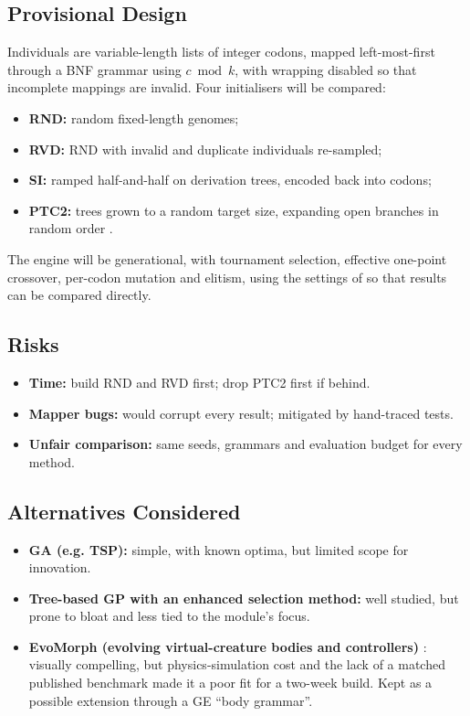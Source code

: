 \documentclass[11pt,a4paper]{article}
\begin{document}
    \subsection{Provisional Design}\label{subsec:provisional-design}
    Individuals are variable-length lists of integer codons, mapped left-most-first through a BNF grammar using $c \bmod k$, with wrapping disabled so that incomplete mappings are invalid.
    Four initialisers will be compared:
    \begin{itemize}[leftmargin=*,itemsep=0pt]
        \item \textbf{RND:} random fixed-length genomes;
        \item \textbf{RVD:} RND with invalid and duplicate individuals re-sampled;
        \item \textbf{SI:} ramped half-and-half on derivation trees, encoded back into codons;
        \item \textbf{PTC2:} trees grown to a random target size, expanding open branches in random order \citep{luke2000,harper2010}.
    \end{itemize}
    The engine will be generational, with tournament selection, effective one-point crossover, per-codon mutation and elitism, using the settings of \citet[Table 2]{nicolau2017} so that results can be compared directly.

    \subsection{Risks}\label{subsec:risks}
    \begin{itemize}[leftmargin=*,itemsep=0pt]
        \item \textbf{Time:} build RND and RVD first; drop PTC2 first if behind.
        \item \textbf{Mapper bugs:} would corrupt every result; mitigated by hand-traced tests.
        \item \textbf{Unfair comparison:} same seeds, grammars and evaluation budget for every method.
    \end{itemize}

    \subsection{Alternatives Considered}\label{subsec:alternatives-considered}
    \begin{itemize}[leftmargin=*,itemsep=0pt]
        \item \textbf{GA (e.g. TSP):} simple, with known optima, but limited scope for innovation.
        \item \textbf{Tree-based GP with an enhanced selection method:} well studied, but prone to bloat and less tied to the module's focus.
        \item \textbf{EvoMorph (evolving virtual-creature bodies and controllers)} \citep{sims1994,lipson2000}: visually compelling, but physics-simulation cost and the lack of a matched published benchmark made it a poor fit for a two-week build. Kept as a possible extension through a GE ``body grammar''.
    \end{itemize}
\end{document}
